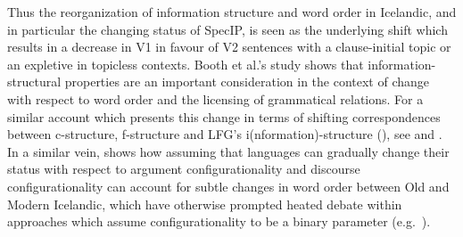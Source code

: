 \documentclass[output=paper,hidelinks]{langscibook}
\begin{document}
\begin{exe}
\ex {}
\end{exe}


Thus the reorganization of information structure and word order in Icelandic, and in particular the changing status of SpecIP, is seen as the underlying shift which results in a decrease in V1 in favour of V2 sentences with a clause-initial topic or an expletive in topicless contexts. Booth et al.'s study shows that infor\-ma\-tion-structural properties are an important consideration in the context of change with respect to word order and the licensing of grammatical relations.
For a similar account which presents this change in terms of shifting correspondences between c-structure, f-structure and LFG's i(nformation)-structure (\citealp{BK96,King1997}), see \citet{booth-schaetzle:2019-cr} and \citet{booth-beck20200jhs}.
In a similar vein, \citet{booth2021revisiting} shows how assuming that languages can gradually change their status with respect to argument configurationality and discourse configurationality can account for subtle changes in word order between Old and Modern Icelandic, which have otherwise prompted heated debate within approaches which assume configurationality to be a binary parameter (e.g.~\citealp{Faarlund1990,Rognvaldsson95}).
\end{document}
